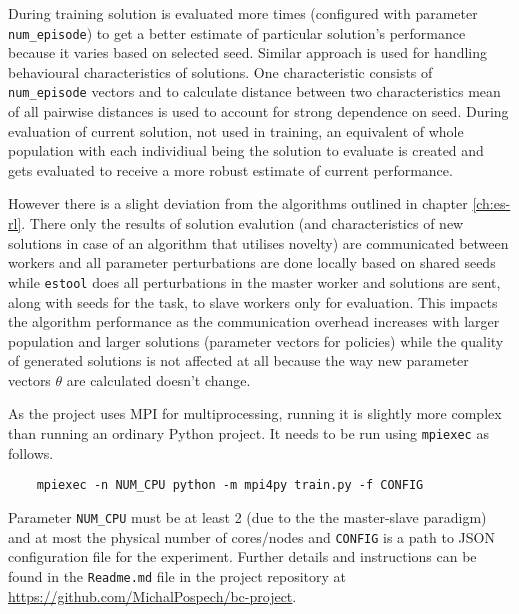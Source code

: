 During training solution is evaluated more times (configured with parameter \texttt{num\_episode}) to get a better estimate of particular solution's performance because it varies based on selected seed. Similar approach is used for handling behavioural characteristics of solutions. One characteristic consists of \texttt{num\_episode} vectors and to calculate distance between two characteristics mean of all pairwise distances is used to account for strong dependence on seed. During evaluation of current solution, not used in training, an equivalent of whole population with each individiual being the solution to evaluate is created and gets evaluated to receive a more robust estimate of current performance.

However there is a slight deviation from the algorithms outlined in chapter \ref{ch:es-rl}. There only the results of solution evalution (and characteristics of new solutions in case of an algorithm that utilises novelty) are communicated between workers and all parameter perturbations are done locally based on shared seeds while \texttt{estool} does all perturbations in the master worker and solutions are sent, along with seeds for the task, to slave workers only for evaluation. This impacts the algorithm performance as the communication overhead increases with larger population and larger solutions (parameter vectors for policies) while the quality of generated solutions is not affected at all because the way new parameter vectors $\theta$ are calculated doesn't change.

As the project uses MPI for multiprocessing, running it is slightly more complex than running an ordinary Python project. It needs to be run using \texttt{mpiexec} as follows.
\begin{verbatim}
    mpiexec -n NUM_CPU python -m mpi4py train.py -f CONFIG
\end{verbatim}

Parameter \texttt{NUM\_CPU} must be at least 2 (due to the the master-slave paradigm) and at most the physical number of cores/nodes and \texttt{CONFIG} is a path to JSON configuration file for the experiment. Further details and instructions can be found in the \texttt{Readme.md} file in the project repository at \url{https://github.com/MichalPospech/bc-project}.
